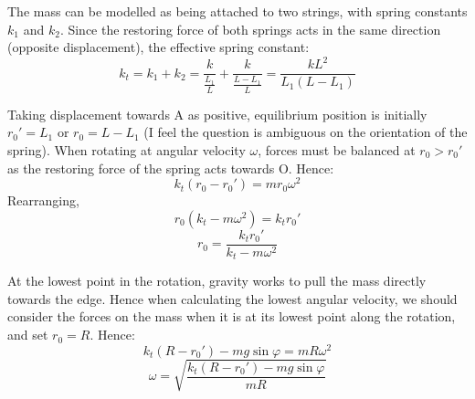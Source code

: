 \begin{solution}
    \begin{subsolution}
        The mass can be modelled as being attached to two strings, with spring constants $k_1$ and $k_2$. Since the restoring force of both springs acts in the same direction (opposite displacement), the effective spring constant:
        \[k_t = k_1 + k_2 = \frac{k}{\frac{L_1}{L}} + \frac{k}{\frac{L-L_1}{L}} = \boxed{\frac{kL^2}{L_1(L-L_1)}}\]
    \end{subsolution}
    \begin{subsolution}
        Taking displacement towards A as positive, equilibrium position is initially $r_0' = L_1$ or $r_0 = L-L_1$ (I feel the question is ambiguous on the orientation of the spring). 
        When rotating at angular velocity $\omega$, forces must be balanced at $r_0 > r_0'$ as the restoring force of the spring acts towards O. Hence:
        \[k_t(r_0-r_0') = mr_0\omega^2\]
        Rearranging,
        \[r_0(k_t-m\omega^2) = k_tr_0'\]
        \[\boxed{r_0 = \frac{k_tr_0'}{k_t-m\omega^2}}\]
    \end{subsolution}
    \begin{subsolution}
        At the lowest point in the rotation, gravity works to pull the mass directly towards the edge. Hence when calculating the lowest angular velocity, we should consider the forces on the mass when it is at its lowest point along the rotation, and set $r_0 = R$. Hence:
        \[k_t(R-r_0')-mg\sin\varphi = mR\omega^2\]
        \[\boxed{\omega = \sqrt{\frac{k_t(R-r_0')-mg\sin\varphi}{mR}}}\]
    \end{subsolution}
\end{solution}
